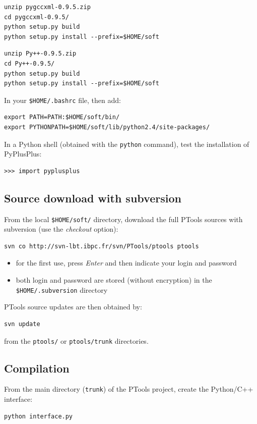 \documentclass[12pt,a4paper]{article}
\begin{document}
\begin{verbatim}
unzip pygccxml-0.9.5.zip
cd pygccxml-0.9.5/
python setup.py build
python setup.py install --prefix=$HOME/soft
\end{verbatim}

\begin{verbatim}
unzip Py++-0.9.5.zip 
cd Py++-0.9.5/
python setup.py build
python setup.py install --prefix=$HOME/soft
\end{verbatim}

In your {\tt \$HOME/.bashrc} file, then add:
\begin{verbatim}
export PATH=PATH:$HOME/soft/bin/
export PYTHONPATH=$HOME/soft/lib/python2.4/site-packages/
\end{verbatim}

In a Python shell (obtained with the {\tt python} command), test the installation
of PyPlusPlus:
\begin{verbatim}
>>> import pyplusplus
\end{verbatim}

\subsection{Source download with subversion}

From the local {\tt \$HOME/soft/} directory, download the full PTools sources with subversion (use the {\it checkout} option):
\begin{verbatim}
svn co http://svn-lbt.ibpc.fr/svn/PTools/ptools ptools
\end{verbatim}

\begin{itemize}
\item for the first use, press {\it Enter} and then indicate your login and password
\item both login and password are stored (without encryption) in the {\tt \$HOME/.subversion} directory
\end{itemize}

PTools source updates are then obtained by:
\begin{verbatim}
svn update
\end{verbatim}
from the {\tt ptools/} or {\tt ptools/trunk} directories.


\subsection{Compilation}
From the main directory ({\tt trunk}) of the PTools project, create the Python/C++ interface:
\begin{verbatim}
python interface.py
\end{verbatim}
\end{document}
